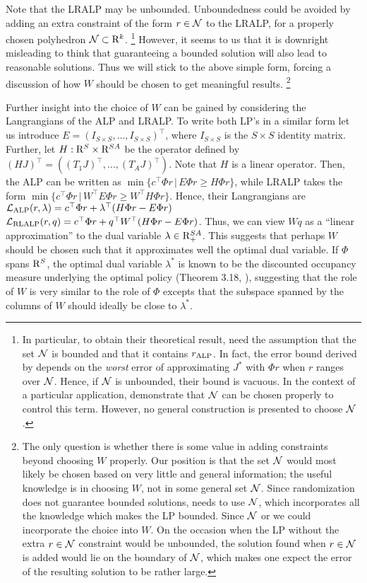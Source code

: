 Note that the LRALP may be unbounded. 
Unboundedness could be avoided by adding an extra constraint of the form $r\in \mathcal{N}$ to the LRALP,
for a properly chosen polyhedron $\mathcal{N} \subset \mathrm{R}^k$.%
\footnote{
In particular, to obtain their theoretical result, \citet{CS} need the assumption that the set $\mathcal{N}$ 
is bounded and that it contains $r_{\text{ALP}}$. In fact, 
the error bound derived by \citeauthor{CS} depends on the \emph{worst} 
error of approximating $J^*$ with $\Phi r$ when
$r$ ranges over $\mathcal{N}$. Hence, if $\mathcal{N}$ is unbounded, their bound is vacuous. In the context of a particular application, 
\citet{CS} demonstrate that $\mathcal{N}$ can be chosen properly to control this term. 
However, no general construction is presented to choose $\mathcal{N}$.}
However, it seems to us that it is downright misleading to think that guaranteeing a bounded solution 
will also lead to reasonable solutions.
Thus we will stick to the above simple form, forcing a discussion of how $W$ should be chosen to get meaningful results.%
\footnote{
The only question is whether there is some value in adding constraints beyond choosing $W$ properly.
Our position is that the set $\mathcal{N}$ would most likely be chosen based on very little and general information;
the useful knowledge is in choosing $W$, not in some general set $\mathcal{N}$. 
Since randomization does not guarantee bounded solutions, \citet{ALP} needs to use $\mathcal{N}$, which incorporates
all the knowledge which makes the LP bounded. Since 
$\mathcal{N}$
or we could incorporate the choice into $W$.
On the occasion when the LP without the extra $r\in \mathcal{N}$ constraint would be unbounded,
the solution found when $r\in \mathcal{N}$ is added would lie on the boundary of $\mathcal{N}$, which
makes one expect the error of the resulting solution to be rather large.
}

Further insight into the choice of $W$ can be gained by
considering the Langrangians of the ALP and LRALP. To write both LP's in a similar form let us introduce $E = (I_{S\times S},\dots,I_{S\times S})^\top$, where $I_{S\times S}$ is the $S\times S$ identity matrix. Further, let $H:\mathrm{R}^S \times \mathrm{R}^{SA}$ be the operator defined by $(HJ)^\top = ( (T_1 J)^\top, \dots, (T_A J)^\top )$. Note that $H$ is a linear operator. Then, the ALP can be written as $\min\{ c^\top \Phi r \,|\, E \Phi r \ge H \Phi r \}$, while LRALP takes the form  
$\min\{ c^\top \Phi r \,|\, W^\top E \Phi r \ge W^\top H \Phi r \}$. 
Hence, their Langrangians are $\mathcal{L}_{\text{ALP}}(r,\lambda) = c^\top \Phi r+\lambda^\top (H\Phi r-E\Phi r)$
$\mathcal{L}_{\text{RLALP}}(r,q) = c^\top \Phi r+q^\top W^\top (H\Phi r-E\Phi r)$. Thus, we can view $W q$ as a ``linear approximation''
to the dual variable $\lambda \in \mathrm{R}_+^{SA}$. 
This suggests that perhaps $W$ should be chosen such that it approximates well the optimal dual variable.
If $\Phi$ spans $\mathrm{R}^{S}$, the optimal dual variable $\lambda^*$ is known to be the discounted occupancy measure underlying the optimal policy (Theorem 3.18, \cite{Kall}), suggesting that the role of $W$ is very similar to the role of $\Phi$ excepts that the subspace spanned by the columns of $W$ should ideally be close to $\lambda^*$.

